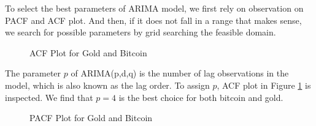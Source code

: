 \documentclass[12pt,a4paper]{article}
\begin{document}
\begin{spacing}{1.2}
To select the best parameters of ARIMA model, we first rely on observation on PACF and ACF plot. And then, if it does not fall in a range that makes sense, we search for possible parameters by grid searching the feasible domain.

\begin{figure}
	\begin{center}
		\caption{ACF Plot for Gold and Bitcoin}
		\label{fig:acf}
	\end{center}
\end{figure}

The parameter $p$ of ARIMA(p,d,q) is the number of lag observations in the model, which is also known as the lag order. To assign $p$, ACF plot in Figure \ref{fig:acf} is inspected. We find that $p=4$ is the best choice for both bitcoin and gold.

\begin{figure}
	\begin{center}
		\label{fig:pacf}
		\caption{PACF Plot for Gold and Bitcoin}
	\end{center}
\end{figure}


\end{spacing}
\end{document}
